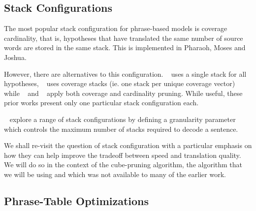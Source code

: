 \documentclass[11pt]{article}
\begin{document}

\subsection{Stack Configurations}

The most popular stack configuration for phrase-based models is coverage cardinality, that is, hypotheses that have translated the same number of source words are stored in the same stack. This is implemented in Pharaoh, Moses and Joshua.


However, there are alternatives to this configuration. ~ uses a single stack for all hypotheses, ~ uses coverage stacks (ie. one stack per unique coverage vector) while ~ and ~ apply both coverage and cardinality pruning. While useful, these prior works present only one particular stack configuration each.

~ explore a range of stack configurations by defining a granularity parameter which controls the maximum number of stacks required to decode a sentence. 

We shall re-visit the question of stack configuration with a particular emphasis on how they can help improve the tradeoff between speed and translation quality. We will do so in the context of the cube-pruning algorithm, the algorithm that we will be using and which was not available to many of the earlier work.

\subsection{Phrase-Table Optimizations}
\end{document}
